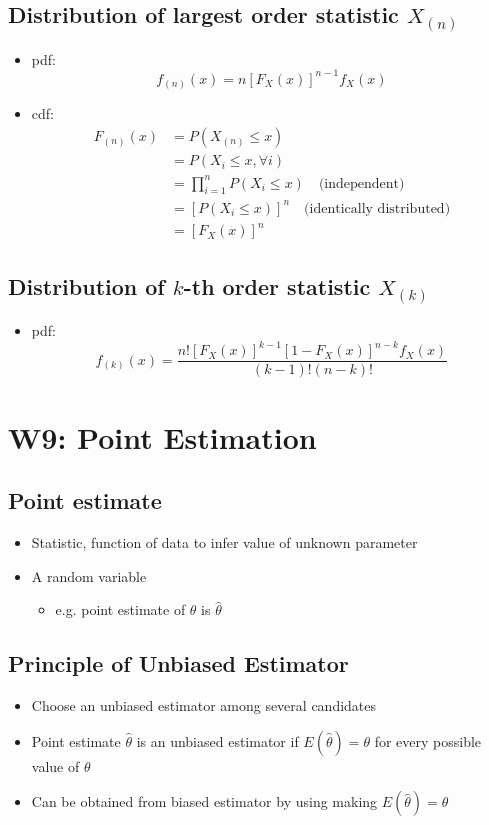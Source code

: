 \documentclass[a4paper]{article}
\begin{document}
\subsection{Distribution of largest order statistic \texorpdfstring{$X_{(n)}$}{X(n)}}
\begin{itemize}
    \item pdf:
    $$f_{(n)}(x) = n\left[F_{X}(x)\right]^{n-1}f_{X}(x)$$
    \item cdf: \begin{align*}
    F_{(n)}(x) &= P(X_{(n)}\leq x)\\
    &= P(X_{i}\leq x, \forall i)\\
    &= \prod_{i=1}^{n}P(X_{i}\leq x) \quad \text{(independent)}\\
    &= \left[P(X_{i}\leq x)\right]^{n} \quad \text{(identically distributed)}\\
    &= \left[F_{X}(x)\right]^{n}
\end{align*}
\end{itemize}
\subsection{Distribution of \texorpdfstring{$k$-th}{k-th} order statistic \texorpdfstring{$X_{(k)}$}{X(k)}}
\begin{itemize}
    \item pdf:
    $$f_{(k)}(x) = \frac{n!\left[F_{X}(x)\right]^{k-1}\left[1-F_{X}(x)\right]^{n-k}f_{X}(x)}{(k-1)!(n-k)!}$$
\end{itemize}
\newpage
\section{W9: Point Estimation}
\subsection{Point estimate}
\begin{itemize}
    \item Statistic, function of data to infer value of unknown parameter
    \item A random variable
    \begin{itemize}[label=$\circ$]
        \item e.g. point estimate of $\theta$ is $\hat{\theta}$
    \end{itemize}
\end{itemize}
\subsection{Principle of Unbiased Estimator}
\begin{itemize}
    \item Choose an unbiased estimator among several candidates
    \item Point estimate $\hat{\theta}$ is an unbiased estimator if $E(\hat{\theta}) = \theta$ for every possible value of $\theta$
    \item Can be obtained from biased estimator by using making $E(\hat{\theta}) = \theta$
\end{itemize}
\end{document}
